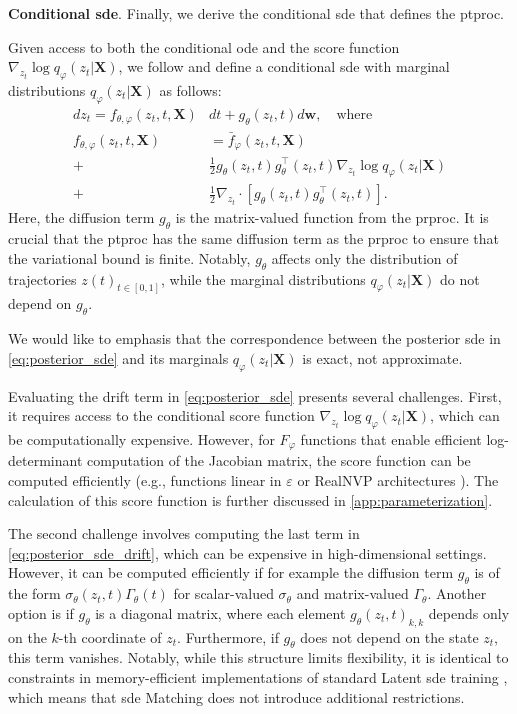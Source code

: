 \documentclass{article}
\def\X{\mathbf{X}}
\def\w{\mathbf{w}}
\def\e{\varepsilon}
\def\ph{\varphi}
\def\th{\theta}
\def\barf{\bar{f}}
\def\n{\nabla}
\theoremstyle{plain}
\theoremstyle{definition}
\theoremstyle{remark}
\begin{document}
\textbf{Conditional \gls{sde}}. Finally, we derive the conditional \gls{sde} that defines the \gls{ptproc}.

Given access to both the conditional \gls{ode} and the score function $\n_{z_t} \log q_\ph(z_t|\X)$, we follow \citet{song2021scorebased} and define a conditional \gls{sde} with marginal distributions $q_\ph(z_t|\X)$ as follows:
\begin{align}
    d z_t = f_{\th,\ph}(z_t, t, \X) &d t  + g_\th(z_t, t) d \w, \quad \textrm{where} 
    \label{eq:posterior_sde} \\
    f_{\th,\ph}(z_t, t, \X) &= 
    \label{eq:posterior_sde_drift}
         \barf_\ph(z_t, t, \X) \\
        + &\frac{1}{2} g_\th(z_t, t) g^\top_\th(z_t, t) \n_{z_t} \log q_\ph(z_t|\X) \nonumber \\
        + &\frac{1}{2} \n_{z_t} \cdot \left[ g_\th(z_t, t) g^\top_\th(z_t, t) \right]. \nonumber
\end{align}
Here, the diffusion term $g_\th$ is the matrix-valued function from the \gls{prproc}. It is crucial that the \gls{ptproc} has the same diffusion term as the \gls{prproc} to ensure that the variational bound is finite. Notably, $g_\th$ affects only the distribution of trajectories ${z(t)}_{t \in [0, 1]}$, while the marginal distributions $q_\ph(z_t|\X)$ do not depend on $g_\th$.


We would like to emphasis that the correspondence between the posterior \gls{sde} in \cref{eq:posterior_sde} and its marginals $q_\ph(z_t|\X)$ is exact, not approximate.


Evaluating the drift term in \cref{eq:posterior_sde} presents several challenges. First, it requires access to the conditional score function $\n_{z_t} \log q_\ph(z_t|\X)$, which can be computationally expensive. However, for $F_\ph$ functions that enable efficient log-determinant computation of the Jacobian matrix, the score function can be computed efficiently (e.g., functions linear in $\e$ or RealNVP architectures \cite{dinh2017density, kingma2018glow}). The calculation of this score function is further discussed in \cref{app:parameterization}.


The second challenge involves computing the last term in \cref{eq:posterior_sde_drift}, which can be expensive in high-dimensional settings. However, it can be computed efficiently if for example the diffusion term $g_\th$ is of the form $\sigma_\th(z_t,t) \Gamma_\th(t)$ for scalar-valued $\sigma_\th$ and matrix-valued $\Gamma_\th$. Another option is if $g_\th$ is a diagonal matrix, where each element $g_\th(z_t, t)_{k,k}$ depends only on the $k$-th coordinate of $z_t$. Furthermore, if $g_\th$ does not depend on the state $z_t$, this term vanishes. Notably, while this structure limits flexibility, it is identical to constraints in memory-efficient implementations of standard Latent \gls{sde} training \cite{li2020scalable}, which means that \gls{sde} Matching does not introduce additional restrictions.
\end{document}
